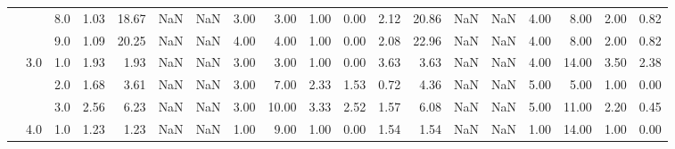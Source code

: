 \begin{tabular}{lllrrrrrrrrrrrrrrrr}
          &     & 8.0  &      1.03 &      18.67 &               NaN &                NaN &  3.00 &   3.00 &             1.00 &                         0.00 &      2.12 &      20.86 &               NaN &                NaN &  4.00 &   8.00 &             2.00 &                         0.82 \\
          &     & 9.0  &      1.09 &      20.25 &               NaN &                NaN &  4.00 &   4.00 &             1.00 &                         0.00 &      2.08 &      22.96 &               NaN &                NaN &  4.00 &   8.00 &             2.00 &                         0.82 \\
          & 3.0 & 1.0  &      1.93 &       1.93 &               NaN &                NaN &  3.00 &   3.00 &             1.00 &                         0.00 &      3.63 &       3.63 &               NaN &                NaN &  4.00 &  14.00 &             3.50 &                         2.38 \\
          &     & 2.0  &      1.68 &       3.61 &               NaN &                NaN &  3.00 &   7.00 &             2.33 &                         1.53 &      0.72 &       4.36 &               NaN &                NaN &  5.00 &   5.00 &             1.00 &                         0.00 \\
          &     & 3.0  &      2.56 &       6.23 &               NaN &                NaN &  3.00 &  10.00 &             3.33 &                         2.52 &      1.57 &       6.08 &               NaN &                NaN &  5.00 &  11.00 &             2.20 &                         0.45 \\
          & 4.0 & 1.0  &      1.23 &       1.23 &               NaN &                NaN &  1.00 &   9.00 &             1.00 &                         0.00 &      1.54 &       1.54 &               NaN &                NaN &  1.00 &  14.00 &             1.00 &                         0.00 \\
\bottomrule
\end{tabular}
